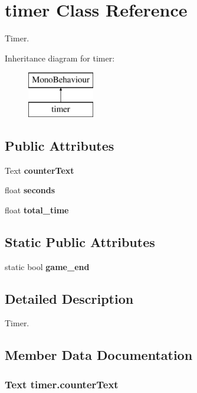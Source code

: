 \section{timer Class Reference}
\label{classtimer}


Timer.  


Inheritance diagram for timer\+:\begin{figure}[H]
\begin{center}
\leavevmode
\includegraphics[height=2.000000cm]{classtimer}
\end{center}
\end{figure}
\subsection*{Public Attributes}
\begin{DoxyCompactItemize}
\item 
Text {\bf counter\+Text}
\item 
float {\bf seconds}
\item 
float {\bf total\+\_\+time}
\end{DoxyCompactItemize}
\subsection*{Static Public Attributes}
\begin{DoxyCompactItemize}
\item 
static bool {\bf game\+\_\+end}
\end{DoxyCompactItemize}


\subsection{Detailed Description}
Timer. 



\subsection{Member Data Documentation}
\subsubsection[{counter\+Text}]{\setlength{\rightskip}{0pt plus 5cm}Text timer.\+counter\+Text}\label{classtimer_a7a195b33a9ec050267f1a377ea47e1a8}
